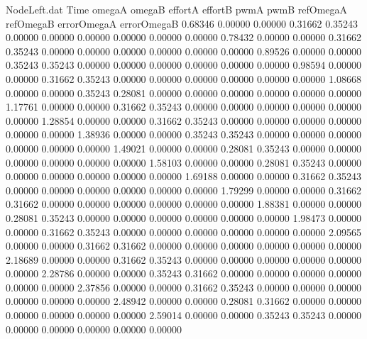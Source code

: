 \begin{filecontents}{NodeLeft.dat}
Time omegaA omegaB effortA effortB pwmA pwmB refOmegaA refOmegaB errorOmegaA errorOmegaB
   0.68346    0.00000    0.00000     0.31662    0.35243    0.00000    0.00000    0.00000    0.00000    0.00000    0.00000
   0.78432    0.00000    0.00000     0.31662    0.35243    0.00000    0.00000    0.00000    0.00000    0.00000    0.00000
   0.89526    0.00000    0.00000     0.35243    0.35243    0.00000    0.00000    0.00000    0.00000    0.00000    0.00000
   0.98594    0.00000    0.00000     0.31662    0.35243    0.00000    0.00000    0.00000    0.00000    0.00000    0.00000
   1.08668    0.00000    0.00000     0.35243    0.28081    0.00000    0.00000    0.00000    0.00000    0.00000    0.00000
   1.17761    0.00000    0.00000     0.31662    0.35243    0.00000    0.00000    0.00000    0.00000    0.00000    0.00000
   1.28854    0.00000    0.00000     0.31662    0.35243    0.00000    0.00000    0.00000    0.00000    0.00000    0.00000
   1.38936    0.00000    0.00000     0.35243    0.35243    0.00000    0.00000    0.00000    0.00000    0.00000    0.00000
   1.49021    0.00000    0.00000     0.28081    0.35243    0.00000    0.00000    0.00000    0.00000    0.00000    0.00000
   1.58103    0.00000    0.00000     0.28081    0.35243    0.00000    0.00000    0.00000    0.00000    0.00000    0.00000
   1.69188    0.00000    0.00000     0.31662    0.35243    0.00000    0.00000    0.00000    0.00000    0.00000    0.00000
   1.79299    0.00000    0.00000     0.31662    0.31662    0.00000    0.00000    0.00000    0.00000    0.00000    0.00000
   1.88381    0.00000    0.00000     0.28081    0.35243    0.00000    0.00000    0.00000    0.00000    0.00000    0.00000
   1.98473    0.00000    0.00000     0.31662    0.35243    0.00000    0.00000    0.00000    0.00000    0.00000    0.00000
   2.09565    0.00000    0.00000     0.31662    0.31662    0.00000    0.00000    0.00000    0.00000    0.00000    0.00000
   2.18689    0.00000    0.00000     0.31662    0.35243    0.00000    0.00000    0.00000    0.00000    0.00000    0.00000
   2.28786    0.00000    0.00000     0.35243    0.31662    0.00000    0.00000    0.00000    0.00000    0.00000    0.00000
   2.37856    0.00000    0.00000     0.31662    0.35243    0.00000    0.00000    0.00000    0.00000    0.00000    0.00000
   2.48942    0.00000    0.00000     0.28081    0.31662    0.00000    0.00000    0.00000    0.00000    0.00000    0.00000
   2.59014    0.00000    0.00000     0.35243    0.35243    0.00000    0.00000    0.00000    0.00000    0.00000    0.00000

\end{filecontents}
